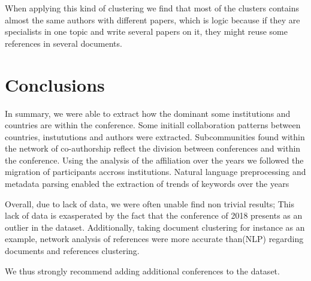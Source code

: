 \documentclass[article,twocolumn]{IEEEtran}
\begin{document}
    When applying this kind of clustering we find that most of the clusters
contains almost the same authors with different papers, which is logic
because if they are specialists in one topic and write several papers on
it, they might reuse some references in several documents.

    \hypertarget{conclusions}{%
\section{Conclusions}\label{conclusions}}

In summary, we were able to extract how the dominant some institutions
and countries are within the conference. Some initiall collaboration
patterns between countries, instututions and authors were extracted.
Subcommunities found within the network of co-authorship reflect the
division between conferences and within the conference. Using the
analysis of the affiliation over the years we followed the migration of
participants accross institutions. Natural language preprocessing and
metadata parsing enabled the extraction of trends of keywords over the
years

Overall, due to lack of data, we were often unable find non trivial
results; This lack of data is exasperated by the fact that the
conference of 2018 presents as an outlier in the dataset. Additionally,
taking document clustering for instance as an example, network analysis
of references were more accurate than(NLP) regarding documents and
references clustering.

We thus strongly recommend adding additional conferences to the dataset.
\newpage

    
    



    
    
\end{document}
